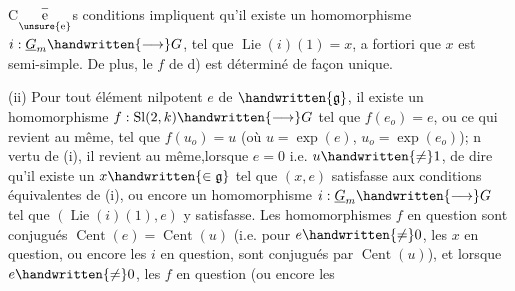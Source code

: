 C$\overset{-}{\underset{\text{\unsure{e}}}{\text{e}}}$s conditions impliquent qu'il existe un homomorphisme $i:\underline{G}_m\handwritten{\longrightarrow}G$, tel que $\operatorname{Lie}(i)(1)=x$, a fortiori que $x$ est semi-simple. De plus, le $f$ de d) est déterminé de façon unique.

(ii) Pour tout élément nilpotent $e$ de $\handwritten{\mathfrak{g}}$, il existe un homomorphisme $f:\operatorname{Sl}(2,k)\handwritten{\longrightarrow}G$ tel que $f(e_o)=e$, ou ce qui revient au même, tel que $f(u_o)=u$ (où $u=\exp(e)$, $u_o=\exp(e_o)$); n vertu de (i), il revient au même,\deleted{\unsure{(}}lorsque $e=0$ i\handwritten{/}.e. $u\handwritten{\ne}1$, de dire qu'il existe un $x\handwritten{\in\mathfrak{g}}$ tel que $(x,e)$ satisfasse aux conditions équivalentes de (i), ou encore un homomorphisme $i:\underline{G}_m\handwritten{\longrightarrow}G$ tel que $(\operatorname{Lie}(i)(1),e)$ y satisfasse. Les homomorphismes $f$ en question sont conjugués $\operatorname{Cent}(e)=\operatorname{Cent}(u)$ (i.e. pour $e\handwritten{\ne}0$, les $x$ en question, ou encore les $i$ en question, sont conjugués  par $\operatorname{Cent}(u)$), et lorsque $e\handwritten{\ne}0$, les  $f$ en question (ou encore les

